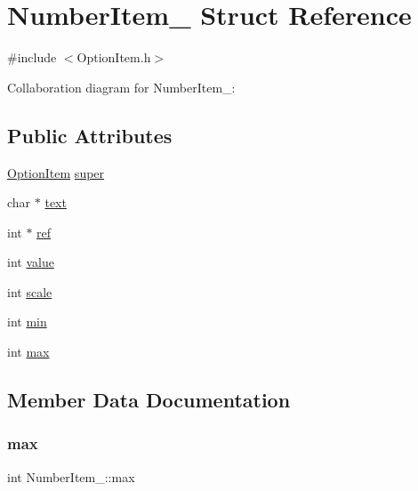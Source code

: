 \hypertarget{structNumberItem__}{}\section{Number\+Item\+\_\+ Struct Reference}
\label{structNumberItem__}


{\ttfamily \#include $<$Option\+Item.\+h$>$}



Collaboration diagram for Number\+Item\+\_\+\+:
\subsection*{Public Attributes}
\begin{DoxyCompactItemize}
\item 
\hyperlink{OptionItem_8h_ae801b448d89e9564273432c06d91b784}{Option\+Item} \hyperlink{structNumberItem___a198e528297a15ff87547936b8e82f564}{super}
\item 
char $\ast$ \hyperlink{structNumberItem___adbed2f01cc73a246c5ba1307c255d650}{text}
\item 
int $\ast$ \hyperlink{structNumberItem___a15257f8840796618e380cd2f531d9f4c}{ref}
\item 
int \hyperlink{structNumberItem___ab32be4b8d568becf0945f399d37e30f7}{value}
\item 
int \hyperlink{structNumberItem___a14a953eee42c8102e7e69b50dac42301}{scale}
\item 
int \hyperlink{structNumberItem___ae10b3938924965a3dc5d11db594809d9}{min}
\item 
int \hyperlink{structNumberItem___a666c61d5b572aaa843b4e93c2af190f9}{max}
\end{DoxyCompactItemize}


\subsection{Member Data Documentation}
\mbox{\label{structNumberItem___a666c61d5b572aaa843b4e93c2af190f9}} 
\subsubsection{\texorpdfstring{max}{max}}
{\footnotesize\ttfamily int Number\+Item\+\_\+\+::max}

\mbox{\label{structNumberItem___ae10b3938924965a3dc5d11db594809d9}} 
